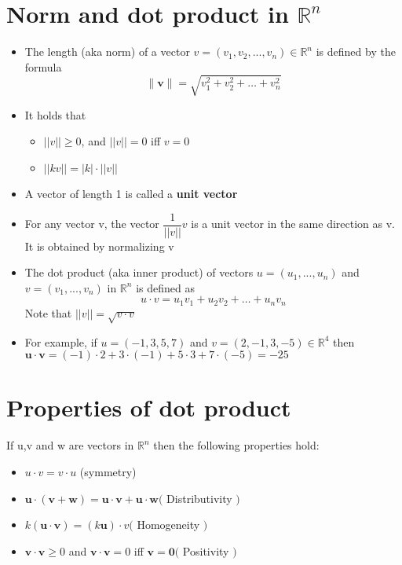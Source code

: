 \documentclass{article}[18pt]
\begin{document}
\section{Norm and dot product in $\mathbb{R}^n$}
\begin{itemize}
	\item The length (aka norm) of a vector $v=(v_1,v_2,...,v_n)\in \mathbb{R}^n$ is defined by the formula
	$$\| \mathbf { v } \| = \sqrt { v _ { 1 } ^ { 2 } + v _ { 2 } ^ { 2 } + \ldots + v _ { n } ^ { 2 } }$$
	\item It holds that
	\begin{itemize}
		\item $||v||\geqslant 0$, and $||v||=0$ iff $v=0$
		\item $||kv||=|k|\cdot ||v||$
	\end{itemize}
	\item A vector of length 1 is called a \textbf{unit vector}
	\item For any vector v, the vector $\dfrac{1}{||v||}v$ is a unit vector in the same direction as v. It is obtained by normalizing v
	\item The dot product (aka inner product) of vectors $u=(u_1,...,u_n)$ and $v=(v_1,...,v_n)$ in $\mathbb{ R }^n$ is defined as
	$$u \cdot v = u _ { 1 } v _ { 1 } + u _ { 2 } v _ { 2 } + \ldots + u _ { n } v _ { n }$$
	Note that $||v||=\sqrt{v\cdot v}$
	\item For example, if $u=(-1,3,5,7)$ and $v=(2,-1,3,-5)\in \mathbb{ R }^4$ then $\mathbf { u } \cdot \mathbf { v } = ( - 1 ) \cdot 2 + 3 \cdot ( - 1 ) + 5 \cdot 3 + 7 \cdot ( - 5 ) = - 25$
\end{itemize}
\section{Properties of dot product}
If u,v and w are vectors in $\mathbb{ R }^n$ then the following properties hold:
\begin{itemize}
	\item $u\cdot v=v\cdot u$ (symmetry)
	\item  $\mathbf { u } \cdot ( \mathbf { v } + \mathbf { w } ) = \mathbf { u } \cdot \mathbf { v } + \mathbf { u } \cdot \mathbf { w } ($ Distributivity $)$
	\item $k ( \mathbf { u } \cdot \mathbf { v } ) = ( k \mathbf { u } ) \cdot v ($ Homogeneity $)$
	\item $\mathbf { v } \cdot \mathbf { v } \geq 0$ and $\mathbf { v } \cdot \mathbf { v } = 0$ iff $\mathbf { v } = \mathbf { 0 } ($ Positivity $)$
\end{itemize}
\end{document}
